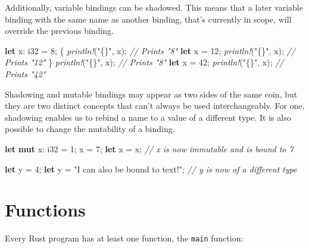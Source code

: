 \documentclass[a4paper,]{book}
\newenvironment{Shaded}{\begin{snugshade}}{\end{snugshade}}
\newcommand{\KeywordTok}[1]{\textcolor[rgb]{0.13,0.29,0.53}{\textbf{{#1}}}}
\newcommand{\DataTypeTok}[1]{\textcolor[rgb]{0.13,0.29,0.53}{{#1}}}
\newcommand{\DecValTok}[1]{\textcolor[rgb]{0.00,0.00,0.81}{{#1}}}
\newcommand{\StringTok}[1]{\textcolor[rgb]{0.31,0.60,0.02}{{#1}}}
\newcommand{\CommentTok}[1]{\textcolor[rgb]{0.56,0.35,0.01}{\textit{{#1}}}}
\newcommand{\PreprocessorTok}[1]{\textcolor[rgb]{0.56,0.35,0.01}{\textit{{#1}}}}
\newcommand{\NormalTok}[1]{{#1}}
\begin{document}
Additionally, variable bindings can be shadowed. This means that a later
variable binding with the same name as another binding, that's currently
in scope, will override the previous binding.

\begin{Shaded}
\begin{Highlighting}[]
\KeywordTok{let} \NormalTok{x: }\DataTypeTok{i32} \NormalTok{= }\DecValTok{8}\NormalTok{;}
\NormalTok{\{}
    \PreprocessorTok{println!}\NormalTok{(}\StringTok{"\{\}"}\NormalTok{, x); }\CommentTok{// Prints "8"}
    \KeywordTok{let} \NormalTok{x = }\DecValTok{12}\NormalTok{;}
    \PreprocessorTok{println!}\NormalTok{(}\StringTok{"\{\}"}\NormalTok{, x); }\CommentTok{// Prints "12"}
\NormalTok{\}}
\PreprocessorTok{println!}\NormalTok{(}\StringTok{"\{\}"}\NormalTok{, x); }\CommentTok{// Prints "8"}
\KeywordTok{let} \NormalTok{x =  }\DecValTok{42}\NormalTok{;}
\PreprocessorTok{println!}\NormalTok{(}\StringTok{"\{\}"}\NormalTok{, x); }\CommentTok{// Prints "42"}
\end{Highlighting}
\end{Shaded}

Shadowing and mutable bindings may appear as two sides of the same coin,
but they are two distinct concepts that can't always be used
interchangeably. For one, shadowing enables us to rebind a name to a
value of a different type. It is also possible to change the mutability
of a binding.

\begin{Shaded}
\begin{Highlighting}[]
\KeywordTok{let} \KeywordTok{mut} \NormalTok{x: }\DataTypeTok{i32} \NormalTok{= }\DecValTok{1}\NormalTok{;}
\NormalTok{x = }\DecValTok{7}\NormalTok{;}
\KeywordTok{let} \NormalTok{x = x; }\CommentTok{// x is now immutable and is bound to 7}

\KeywordTok{let} \NormalTok{y = }\DecValTok{4}\NormalTok{;}
\KeywordTok{let} \NormalTok{y = }\StringTok{"I can also be bound to text!"}\NormalTok{; }\CommentTok{// y is now of a different type}
\end{Highlighting}
\end{Shaded}

\hypertarget{sec--functions}{\section{Functions}\label{sec--functions}}

Every Rust program has at least one function, the \texttt{main}
function:
\end{document}
